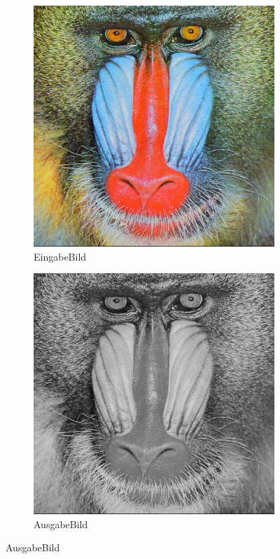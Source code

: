 \documentclass[course=erap]{aspdoc}
\begin{document}
  \begin{figure}[h]
    \begin{subfigure}{0.5\linewidth}
      \centering
      \includegraphics[width=\linewidth]{mandrill-2}
      \caption{EingabeBild}
      \label{fig:eingabe}
    \end{subfigure}%
    \begin{subfigure}{0.5\linewidth}
      \centering
      \includegraphics[width=\linewidth]{mandrillausgabe-2}
      \caption{AusgabeBild}
      \label{fig:ausgabe}
    \end{subfigure}
  \end{figure}
\end{document}
